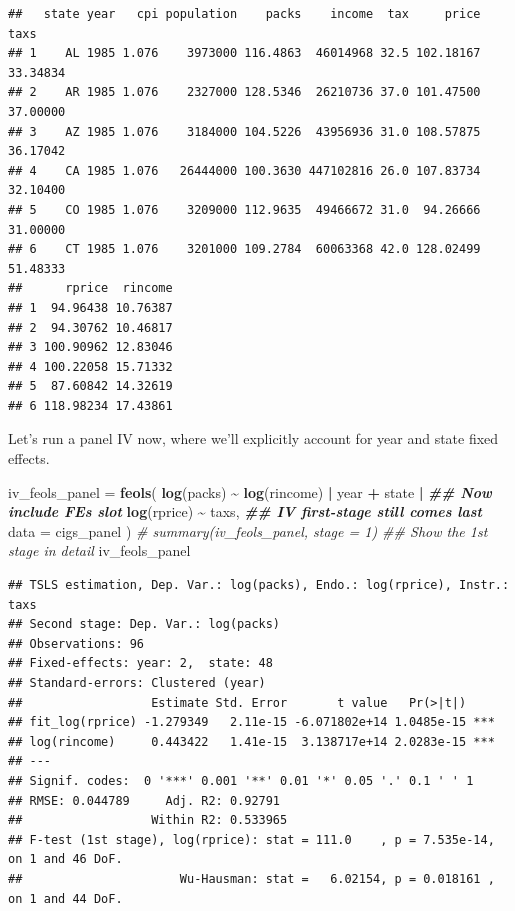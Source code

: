\documentclass[
]{article}
\newenvironment{Shaded}{\begin{snugshade}}{\end{snugshade}}
\newcommand{\AttributeTok}[1]{\textcolor[rgb]{0.13,0.29,0.53}{#1}}
\newcommand{\CommentTok}[1]{\textcolor[rgb]{0.56,0.35,0.01}{\textit{#1}}}
\newcommand{\DocumentationTok}[1]{\textcolor[rgb]{0.56,0.35,0.01}{\textbf{\textit{#1}}}}
\newcommand{\FunctionTok}[1]{\textcolor[rgb]{0.13,0.29,0.53}{\textbf{#1}}}
\newcommand{\NormalTok}[1]{#1}
\newcommand{\OtherTok}[1]{\textcolor[rgb]{0.56,0.35,0.01}{#1}}
\newcommand{\SpecialCharTok}[1]{\textcolor[rgb]{0.81,0.36,0.00}{\textbf{#1}}}
\begin{document}
\begin{verbatim}
##   state year   cpi population    packs    income  tax     price     taxs
## 1    AL 1985 1.076    3973000 116.4863  46014968 32.5 102.18167 33.34834
## 2    AR 1985 1.076    2327000 128.5346  26210736 37.0 101.47500 37.00000
## 3    AZ 1985 1.076    3184000 104.5226  43956936 31.0 108.57875 36.17042
## 4    CA 1985 1.076   26444000 100.3630 447102816 26.0 107.83734 32.10400
## 5    CO 1985 1.076    3209000 112.9635  49466672 31.0  94.26666 31.00000
## 6    CT 1985 1.076    3201000 109.2784  60063368 42.0 128.02499 51.48333
##      rprice  rincome
## 1  94.96438 10.76387
## 2  94.30762 10.46817
## 3 100.90962 12.83046
## 4 100.22058 15.71332
## 5  87.60842 14.32619
## 6 118.98234 17.43861
\end{verbatim}

Let's run a panel IV now, where we'll explicitly account for year and
state fixed effects.

\begin{Shaded}
\begin{Highlighting}[]
\NormalTok{iv\_feols\_panel }\OtherTok{=} 
  \FunctionTok{feols}\NormalTok{(}
    \FunctionTok{log}\NormalTok{(packs) }\SpecialCharTok{\textasciitilde{}} \FunctionTok{log}\NormalTok{(rincome) }\SpecialCharTok{|} 
\NormalTok{      year }\SpecialCharTok{+}\NormalTok{ state }\SpecialCharTok{|}            \DocumentationTok{\#\# Now include FEs slot}
      \FunctionTok{log}\NormalTok{(rprice) }\SpecialCharTok{\textasciitilde{}}\NormalTok{ taxs,       }\DocumentationTok{\#\# IV first{-}stage still comes last}
    \AttributeTok{data =}\NormalTok{ cigs\_panel}
\NormalTok{  )}
\CommentTok{\# summary(iv\_feols\_panel, stage = 1) \#\# Show the 1st stage in detail}
\NormalTok{iv\_feols\_panel}
\end{Highlighting}
\end{Shaded}

\begin{verbatim}
## TSLS estimation, Dep. Var.: log(packs), Endo.: log(rprice), Instr.: taxs
## Second stage: Dep. Var.: log(packs)
## Observations: 96 
## Fixed-effects: year: 2,  state: 48
## Standard-errors: Clustered (year) 
##                  Estimate Std. Error       t value   Pr(>|t|)    
## fit_log(rprice) -1.279349   2.11e-15 -6.071802e+14 1.0485e-15 ***
## log(rincome)     0.443422   1.41e-15  3.138717e+14 2.0283e-15 ***
## ---
## Signif. codes:  0 '***' 0.001 '**' 0.01 '*' 0.05 '.' 0.1 ' ' 1
## RMSE: 0.044789     Adj. R2: 0.92791 
##                  Within R2: 0.533965
## F-test (1st stage), log(rprice): stat = 111.0    , p = 7.535e-14, on 1 and 46 DoF.
##                      Wu-Hausman: stat =   6.02154, p = 0.018161 , on 1 and 44 DoF.
\end{verbatim}
\end{document}
